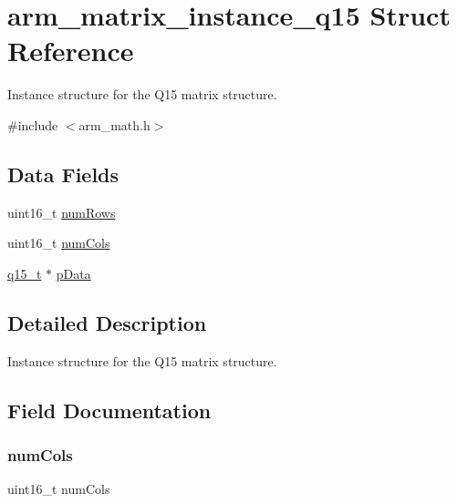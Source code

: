 \hypertarget{structarm__matrix__instance__q15}{}\section{arm\+\_\+matrix\+\_\+instance\+\_\+q15 Struct Reference}
\label{structarm__matrix__instance__q15}


Instance structure for the Q15 matrix structure.  




{\ttfamily \#include $<$arm\+\_\+math.\+h$>$}

\subsection*{Data Fields}
\begin{DoxyCompactItemize}
\item 
uint16\+\_\+t \mbox{\hyperlink{structarm__matrix__instance__q15_a1bcf80ccdc2acc29198f1592ae300390}{num\+Rows}}
\item 
uint16\+\_\+t \mbox{\hyperlink{structarm__matrix__instance__q15_a4bb5ec0d13eb4c9cf887aa8366a44117}{num\+Cols}}
\item 
\mbox{\hyperlink{arm__math_8h_ab5a8fb21a5b3b983d5f54f31614052ea}{q15\+\_\+t}} $\ast$ \mbox{\hyperlink{structarm__matrix__instance__q15_a817ede38365e63e561a12069c6c5c087}{p\+Data}}
\end{DoxyCompactItemize}


\subsection{Detailed Description}
Instance structure for the Q15 matrix structure. 

\subsection{Field Documentation}
\mbox{\label{structarm__matrix__instance__q15_a4bb5ec0d13eb4c9cf887aa8366a44117}} 
\subsubsection{\texorpdfstring{numCols}{numCols}}
{\footnotesize\ttfamily uint16\+\_\+t num\+Cols}


